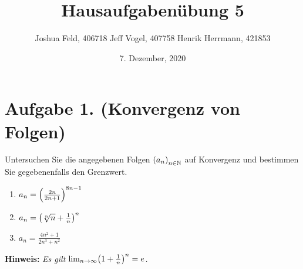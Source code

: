 \documentclass[german,12pt]{homework}
\title{Hausaufgabenübung 5}
\author{Joshua Feld, 406718 \quad Jeff Vogel, 407758 \quad Henrik Herrmann, 421853}
\date{7. Dezember, 2020}
\institute{RWTH Aachen University\\Center for Computational Engineering Science}
\newcommand{\NN}{\mathbb{N}}
\DeclarePairedDelimiter{\enbrace}{(}{)}
\begin{document}
    \maketitle

    \section*{Aufgabe 1. (Konvergenz von Folgen)}

    \begin{problem}
        Untersuchen Sie die angegebenen Folgen \(\enbrace*{a_n}_{n \in \NN}\) auf Konvergenz und bestimmen Sie gegebenenfalls den Grenzwert.
        \begin{enumerate}
            \item \(a_n = \enbrace*{\frac{2n}{2n + 1}}^{8n - 1}\)
            \item \(a_n = \enbrace*{\sqrt[n]{n} + \frac{1}{n}}^n\)
            \item \(a_n = \frac{4n^2 + 1}{2n^3 + n^2}\)
        \end{enumerate}
        \textbf{Hinweis:} \quad \emph{Es gilt \(\lim_{n \to \infty}\enbrace*{1 + \frac{1}{n}}^n = e\).}
    \end{problem}
\end{document}
